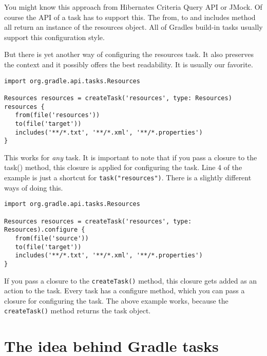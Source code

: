 You might know this approach from Hibernates Criteria Query API or JMock. Of course the API of a task has to support this. The from, to and includes method all return an instance of the resources object. All of Gradles build-in tasks usually support this configuration style.

But there is yet another way of configuring the resources task. It also preserves the context and it possibly offers the best readability. It is usually our favorite.

\begin{Verbatim}[linenumbers=left]
import org.gradle.api.tasks.Resources

Resources resources = createTask('resources', type: Resources)
resources {
   from(file('resources'))
   to(file('target'))
   includes('**/*.txt', '**/*.xml', '**/*.properties')
}
\end{Verbatim}

This works for \emph{any} task. It is important to note that if you pass a closure to the task() method, this closure is applied for configuring the task. Line 4 of the example is just a shortcut for \texttt{task("resources")}. There is a slightly different ways of doing this.

\begin{Verbatim}[linenumbers=left]
import org.gradle.api.tasks.Resources

Resources resources = createTask('resources', type: Resources).configure {
   from(file('source'))
   to(file('target'))
   includes('**/*.txt', '**/*.xml', '**/*.properties')
}	
\end{Verbatim}

If you pass a closure to the \texttt{createTask()} method, this closure gets added as an action to the task. Every task has a configure method, which you can pass a closure for configuring the task. The above example works, because the \texttt{createTask()} method returns the task object.

\section{The idea behind Gradle tasks} %
\label{sec:the_idea_behind_gradle_tasks}

